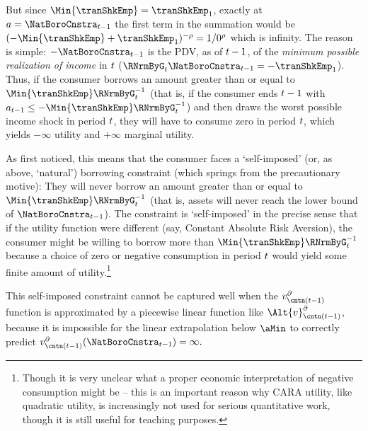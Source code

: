 But since $\Min{\tranShkEmp}=\tranShkEmp_{1}$, exactly at $\aNrm=\NatBoroCnstra_{\prdT-1}$ the first term in the summation would be $(-\Min{\tranShkEmp}+\tranShkEmp_{1})^{-\CRRA}=1/0^{\CRRA}$ which is infinity.  The reason is simple: $-\NatBoroCnstra_{\prdT-1}$ is the PDV, as of $t-1$, of the \emph{minimum possible realization of income} in $t$ ($\RNrmByG_{\prdT}\NatBoroCnstra_{\prdT-1} = -\tranShkEmp_{1}$).  Thus, if the consumer borrows an amount greater than or equal to $\Min{\tranShkEmp}\RNrmByG_{\prdT}^{-1}$ (that is, if the consumer ends $t-1$ with $a_{\prdT-1} \leq -\Min{\tranShkEmp}\RNrmByG_{\prdT}^{-1}$) and then draws the worst possible income shock in period $t$, they will have to consume zero in period $t$, which yields $-\infty$ utility and $+\infty$ marginal utility.

As \cite{zeldesStochastic} first noticed, this means that the consumer faces a `self-imposed' (or, as above, `natural') borrowing constraint (which springs from the precautionary motive): They will never borrow an amount greater than or equal to $\Min{\tranShkEmp}\RNrmByG_{\prdT}^{-1}$ (that is, assets will never reach the lower bound of $\NatBoroCnstra_{\prdT-1}$).  The constraint is `self-imposed' in the precise sense that if the utility function were different (say, Constant Absolute Risk Aversion), the consumer might be willing to borrow more than $\Min{\tranShkEmp}\RNrmByG_{\prdT}^{-1}$ because a choice of zero or negative consumption in period $t$ would yield some finite amount of utility.\footnote{Though it is very unclear what a proper economic interpretation of negative consumption might be -- this is an important reason why CARA utility, like quadratic utility, is increasingly not used for serious quantitative work, though it is still useful for teaching purposes.}

This self-imposed constraint cannot be captured well when the $\vFunc^{\partial}_{{\cntn}(\prdT-1)}$ function is approximated by a piecewise linear function like $\Alt{\vFunc}^{\partial}_{{\cntn}(\prdT-1)}$, because it is impossible for the linear extrapolation below $\aMin$ to correctly predict $\vFunc^{\partial}_{{\cntn}(\prdT-1)}(\NatBoroCnstra_{\prdT-1})=\infty.$ %

